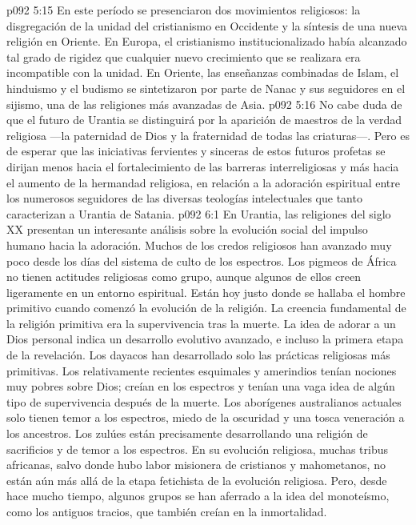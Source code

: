 \vs p092 5:15  En este período se presenciaron dos movimientos religiosos: la disgregación de la unidad del cristianismo en Occidente y la síntesis de una nueva religión en Oriente. En Europa, el cristianismo institucionalizado había alcanzado tal grado de rigidez que cualquier nuevo crecimiento que se realizara era incompatible con la unidad. En Oriente, las enseñanzas combinadas de Islam, el hinduismo y el budismo se sintetizaron por parte de Nanac y sus seguidores en el sijismo, una de las religiones más avanzadas de Asia.
\vs p092 5:16 \pc No cabe duda de que el futuro de Urantia se distinguirá por la aparición de maestros de la verdad religiosa ---la paternidad de Dios y la fraternidad de todas las criaturas---. Pero es de esperar que las iniciativas fervientes y sinceras de estos futuros profetas se dirijan menos hacia el fortalecimiento de las barreras interreligiosas y más hacia el aumento de la hermandad religiosa, en relación a la adoración espiritual entre los numerosos seguidores de las diversas teologías intelectuales que tanto caracterizan a Urantia de Satania.
\vs p092 6:1 En Urantia, las religiones del siglo XX presentan un interesante análisis sobre la evolución social del impulso humano hacia la adoración. Muchos de los credos religiosos han avanzado muy poco desde los días del sistema de culto de los espectros. Los pigmeos de África no tienen actitudes religiosas como grupo, aunque algunos de ellos creen ligeramente en un entorno espiritual. Están hoy justo donde se hallaba el hombre primitivo cuando comenzó la evolución de la religión. La creencia fundamental de la religión primitiva era la supervivencia tras la muerte. La idea de adorar a un Dios personal indica un desarrollo evolutivo avanzado, e incluso la primera etapa de la revelación. Los dayacos han desarrollado solo las prácticas religiosas más primitivas. Los relativamente recientes esquimales y amerindios tenían nociones muy pobres sobre Dios; creían en los espectros y tenían una vaga idea de algún tipo de supervivencia después de la muerte. Los aborígenes australianos actuales solo tienen temor a los espectros, miedo de la oscuridad y una tosca veneración a los ancestros. Los zulúes están precisamente desarrollando una religión de sacrificios y de temor a los espectros. En su evolución religiosa, muchas tribus africanas, salvo donde hubo labor misionera de cristianos y mahometanos, no están aún más allá de la etapa fetichista de la evolución religiosa. Pero, desde hace mucho tiempo, algunos grupos se han aferrado a la idea del monoteísmo, como los antiguos tracios, que también creían en la inmortalidad.
